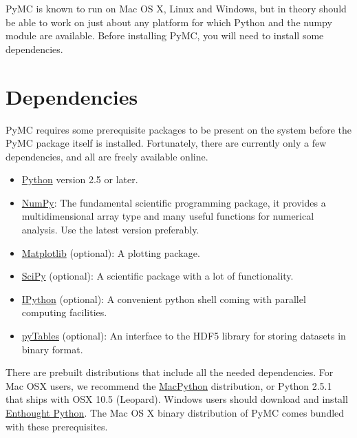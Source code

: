 


PyMC is known to run on Mac OS X, Linux and Windows, but in theory should be
able to work on just about any platform for which Python and the numpy module
are  available. Before installing PyMC, you will need to install some dependencies.



\hypertarget{dependencies}{}
\section*{Dependencies}
\label{dependencies}

PyMC requires some prerequisite packages to be present on the system before the
PyMC package itself is installed. Fortunately, there are currently only a few
dependencies, and all are freely available online.
\begin{itemize}
\item {} 
\href{http://www.python.org/.}{Python} version 2.5 or later.

\item {} 
\href{http://www.scipy.org/NumPy}{NumPy}: The fundamental scientific programming package, it provides a
multidimensional array type and many useful functions for numerical analysis.
Use the latest version preferably.

\item {} 
\href{http://matplotlib.sourceforge.net/}{Matplotlib} (optional): A plotting package.

\item {} 
\href{http://www.scipy.org/}{SciPy} (optional): A scientific package with a lot of functionality.

\item {} 
\href{http://ipython.scipy.org/}{IPython} (optional): A convenient python shell coming with parallel
computing facilities.

\item {} 
\href{http://www.pytables.org/moin}{pyTables} (optional): An interface to the HDF5 library for storing datasets
in binary format.

\end{itemize}

There are prebuilt distributions that include all the needed dependencies. For
Mac OSX users, we recommend the \href{http://www.activestate.com/Products/ActivePython/}{MacPython} distribution, or Python 2.5.1 that
ships with OSX 10.5 (Leopard). Windows users should download and install
\href{http://code.enthought.com/enthon/}{Enthought Python}. The Mac OS X binary distribution of PyMC comes bundled with
these prerequisites.

